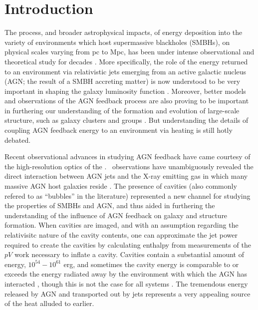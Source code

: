 \documentclass{emulateapj}
\begin{document}


\section{Introduction}
\label{sec:intro}

The process, and broader astrophysical impacts, of energy deposition
into the variety of environments which host supermassive blackholes
(SMBHs), on physical scales varying from pc to Mpc, has been under
intense observational and theoretical study for decades
\citep[\eg][]{1916AbhKP......189S, 1969Natur.223..690L,
  1974MNRAS.166..513S, 1981ApJ...248...55B, 1981ApJ...248...47F,
  1982MNRAS.199..883B, 1984ARA&A..22..471R, 1988Natur.333..829F,
  kaiser91, 1993MNRAS.263..323T, 1997MNRAS.288..355B,
  1998A&A...331L...1S, 2000ApJ...539L..13G, voitbryan,
  2004ApJ...613..811M, best05, benson03, accept}. More specifically,
the role of the energy returned to an environment via relativistic
jets emerging from an active galactic nucleus (AGN; the result of a
SMBH accreting matter) is now understood to be very important in
shaping the galaxy luminosity function \citep{croton06, bower06,
  saro06, sijacki07}. Moreover, better models and observations of the
AGN feedback process are also proving to be important in furthering
our understanding of the formation and evolution of large-scale
structure, such as galaxy clusters and groups \citep[see, for
  example,][]{2008MNRAS.386.1309M, minggroups}. But understanding the
details of coupling AGN feedback energy to an environment via heating
is still hotly debated.

Recent observational advances in studying AGN feedback have came
courtesy of the high-resolution optics of the
\cxo. \chandra\ observations have unambiguously revealed the direct
interaction between AGN jets and the X-ray emitting gas in which many
massive AGN host galaxies reside \citep[\eg][]{2000ApJ...534L.135M,
  perseus1, schindler01}. The presence of cavities (also commonly
refered to as ``bubbles'' in the literature) represented a new channel
for studying the properties of SMBHs and AGN, and thus aided in
furthering the understanding of the influence of AGN feedback on
galaxy and structure formation. When cavities are imaged, and with an
assumption regarding the relativisitc nature of the cavity contents,
one can approximate the jet power required to create the cavities by
calculating enthalpy from measurements of the $pV$ work necessary to
inflate a cavity. Cavities contain a substantial amount of energy,
$10^{54}-10^{61}$ erg, and sometimes the cavity energy is comparable
to or exceeds the energy radiated away by the environment with which
the AGN has interacted \citep{birzan04}, though this is not the case
for all systems \citep{dunn08}. The tremendous energy released by AGN
and transported out by jets represents a very appealing source of the
heat alluded to earlier.
\end{document}
